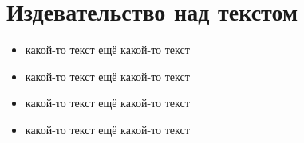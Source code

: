\documentclass[12pt, a4paper]{article}
\theoremstyle{plain}              %
\theoremstyle{definition}         %
\begin{document}
\section{Издевательство над текстом}

\begin{itemize}
\item какой-то текст  ещё какой-то текст
\item какой-то текст  ещё какой-то текст
\item какой-то текст  ещё какой-то текст
\item какой-то текст  ещё какой-то текст
\end{itemize}
\end{document}
